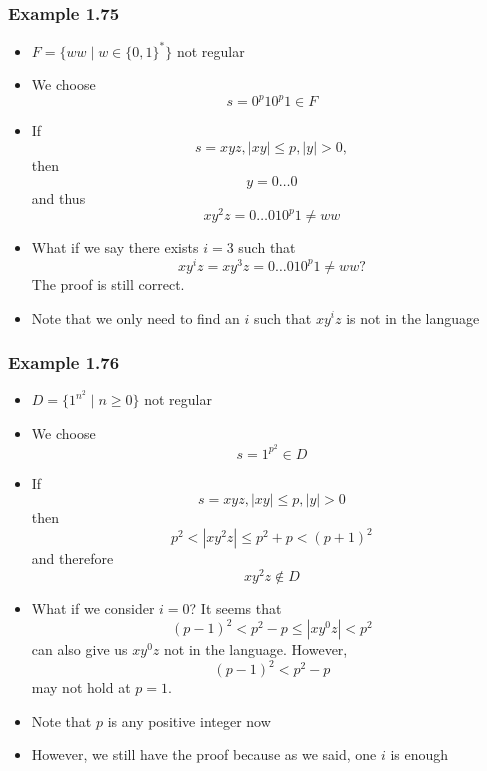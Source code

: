 \begin{frame}[allowframebreaks] \frametitle{Example 1.75}
  \begin{itemize}
\item $F=\{ww\mid w \in \{0,1\}^*\}$ not regular
\item We choose
  \begin{equation*}
s=0^p 1 0^p 1 \in F
\end{equation*}
\item If
  \begin{equation*}
    s =xyz,
    |xy|
\leq p, |y|>0,
\end{equation*}
then
\begin{equation*}
 y = 0\ldots 0
\end{equation*}
and thus
\begin{equation*}
xy^2z = 0 \ldots 0 1 0^p 1\neq ww
\end{equation*}
\item What if we say there exists $i = 3$ such that
  \begin{equation*}
xy^iz = xy^3z = 0 \ldots 0 1 0^p 1\neq ww?
\end{equation*}
The proof is still correct. 
\item Note that we only need to \alert{find an $i$}
such that $xy^iz$ is not in the language
\end{itemize}\end{frame} \begin{frame}[allowframebreaks] \frametitle{Example 1.76}
  \begin{itemize}
\item $D=\{1^{n^2}
\mid n \geq 0\}$ not regular
\item We choose
  \begin{equation*}
  s=1^{p^2} \in D
\end{equation*}
\item If 
  \begin{equation*}
s =xyz, |xy |\leq p, |y|>0
\end{equation*}
then 
\begin{equation*}
p^2 < |xy^2z| \leq p^2 +p < (p+1)^2
\end{equation*}
and therefore
\begin{equation*}
  xy^2 z \notin D
\end{equation*}
\item What if we consider $i=0$? It seems that
  \begin{equation*}
(p-1)^2 < p^2 -p \leq |xy^0z| < p^2 
\end{equation*}
can also give us $xy^0z$ not in the language. However,
\begin{equation*}
  (p-1)^2 < p^2 -p
\end{equation*}
may not hold at $p = 1$. 
\item Note that $p$ is any positive integer now
\item However, we still have the proof because as we said,
  one $i$ is enough
\end{itemize}\end{frame}


